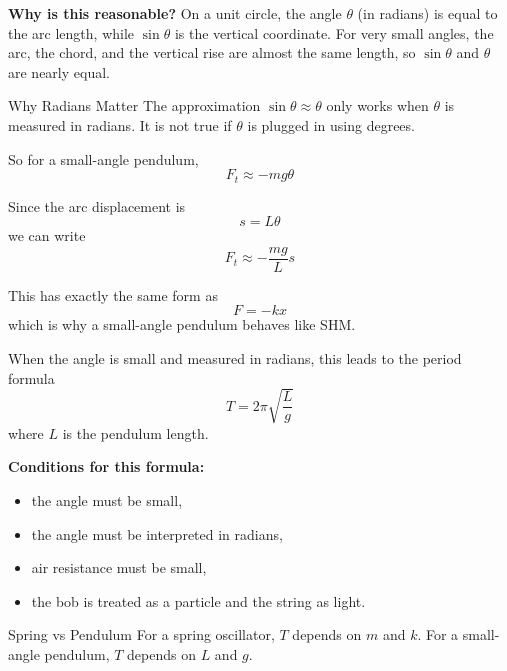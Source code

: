 \textbf{Why is this reasonable?} On a unit circle, the angle $\theta$ (in radians) is equal to the arc length, while $\sin\theta$ is the vertical coordinate. For very small angles, the arc, the chord, and the vertical rise are almost the same length, so $\sin\theta$ and $\theta$ are nearly equal.

\begin{keyidea}{Why Radians Matter}
The approximation $\sin\theta \approx \theta$ only works when $\theta$ is measured in radians. It is not true if $\theta$ is plugged in using degrees.
\end{keyidea}

So for a small-angle pendulum,
\begin{equation}
    F_t \approx -mg\theta
\end{equation}

Since the arc displacement is
\begin{equation}
    s = L\theta
\end{equation}
we can write
\begin{equation}
    F_t \approx -\frac{mg}{L}s
\end{equation}

This has exactly the same form as
\begin{equation}
    F = -kx
\end{equation}
which is why a small-angle pendulum behaves like SHM.

When the angle is small and measured in radians, this leads to the period formula
\begin{equation}
    T = 2\pi\sqrt{\frac{L}{g}}
\end{equation}
where $L$ is the pendulum length.

\textbf{Conditions for this formula:}
\begin{itemize}
    \item the angle must be small,
    \item the angle must be interpreted in radians,
    \item air resistance must be small,
    \item the bob is treated as a particle and the string as light.
\end{itemize}

\begin{keyidea}{Spring vs Pendulum}
For a spring oscillator, $T$ depends on $m$ and $k$. For a small-angle pendulum, $T$ depends on $L$ and $g$.
\end{keyidea}

